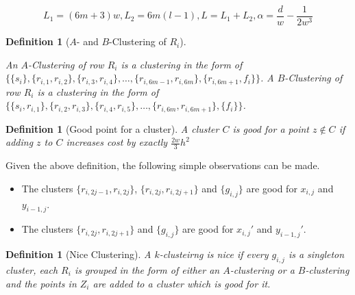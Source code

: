 \documentclass{article}
\newtheorem{definition}[theorem]{Definition}
\begin{document}
$$L_1 = (6m+3)w, L_2 = 6m(l-1), L=L_1 + L_2, \alpha = \frac{d}{w}-\frac{1}{2w^3}$$

\begin{definition}[$A$- and $B$-Clustering of $R_i$]
\label{defn:abclusteringVattani}

An $A$-Clustering of row $R_i$ is a clustering in the form of $\{\{s_i\}, \{r_{i,1}, r_{i,2}\}, \{r_{i,3}, r_{i,4}\}, \ldots, \{r_{i,6m-1}, r_{i,6m}\},\{r_{i, 6m+1}, f_i\}\}$. A $B$-Clustering of row $R_i$ is a clustering in the form of $\{\{s_i, r_{i, 1}\}, \{r_{i,2}, r_{i,3}\}, \{r_{i,4}, r_{i,5}\}, \ldots, \{r_{i,6m}, r_{i,6m+1}\},\{f_i\}\}$. 
\end{definition}

\begin{definition}[Good point for a cluster]
\label{defn:goodPointVattani}
A cluster $C$ is good for a point $z \not\in C$ if adding $z$ to $C$ increases cost by exactly $\frac{2w}{3}h^2$ 
\end{definition}

Given the above definition, the following simple observations can be made. 
\begin{itemize}[nolistsep,noitemsep]
\item The clusters $\{r_{i,2j-1}, r_{i, 2j}\}$, $\{r_{i,2j}, r_{i, 2j+1}\}$ and $\{g_{i,j}\}$ are good for $x_{i,j}$ and $y_{i-1,j}$.
\item The clusters $\{r_{i,2j}, r_{i, 2j+1}\}$ and $\{g_{i,j}\}$ are good for $x_{i,j}'$ and $y_{i-1,j}'$.
\end{itemize}

\begin{definition}[Nice Clustering]
\label{defn:niceClustering}
A $k$-clusteirng is nice if every $g_{i,j}$ is a singleton cluster, each $R_i$ is grouped in the form of either an $A$-clustering or a $B$-clustering and the points in $Z_i$ are added to a cluster which is good for it.
\end{definition}
\end{document}
